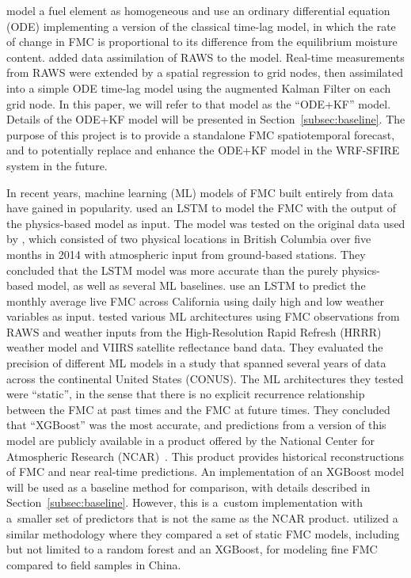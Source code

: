 \documentclass[fire,article,submit,pdftex,moreauthors]{Definitions/mdpi}
\begin{document}
\citet{Mandel-2014-RAA} model a fuel element as homogeneous and use an ordinary differential equation (ODE) implementing a version of the classical time-lag model, in which the rate of change in FMC is proportional to its difference from the equilibrium moisture content. \citet{Vejmelka-2014-DAF} added data assimilation of RAWS to the model. Real-time measurements from RAWS were extended by a spatial regression to grid nodes, then assimilated into a simple ODE time-lag model using the augmented Kalman Filter on each grid node. In this paper, we will refer to that model as the ``ODE+KF'' model. Details of the ODE+KF model will be presented in Section~\ref{subsec:baseline}. The purpose of this project is to provide a standalone FMC spatiotemporal forecast, and to potentially replace and enhance the ODE+KF model in the WRF-SFIRE system in the future.

In recent years, machine learning (ML) models of FMC built entirely from data have gained in popularity. \citet{Fan-2021-PGD} used an LSTM to model the FMC with the output of the \citet{vanderKamp-2017-MFS} physics-based model as input. The model was tested on the original data used by \citet{vanderKamp-2017-MFS}, which consisted of two physical locations in British Columbia over five months in 2014 with atmospheric input from ground-based stations. They concluded that the LSTM model was more accurate than the purely physics-based model, as well as several ML baselines. \citet{Kang-2022-FMC} use an LSTM to predict the monthly average live FMC across California using daily high and low weather variables as input. \citet{Schreck-2023-MLV} tested various ML architectures using FMC observations from RAWS and weather inputs from the High-Resolution Rapid Refresh (HRRR) weather model and VIIRS satellite reflectance band data. They evaluated the precision of different ML models in a study that spanned several years of data across the continental United States (CONUS). The ML architectures they tested were ``static'', in the sense that there is no explicit recurrence relationship between the FMC at past times and the FMC at future times. They concluded that ``XGBoost'' was the most accurate, and predictions from a version of this model are publicly available in a product offered by the National Center for Atmospheric Research (NCAR)~\citep{NCAR-2025-FMC}. This product provides historical reconstructions of FMC and near real-time predictions. An implementation of an XGBoost model will be used as a baseline method for comparison, with details described in Section~\ref{subsec:baseline}. However, this is a~custom implementation with a~smaller set of predictors that is not the same as the NCAR product. \citet{Hou-2024-CAM} utilized a similar methodology where they compared a set of static FMC models, including but not limited to a random forest and an XGBoost, for modeling fine FMC compared to field samples in China.
\end{document}
